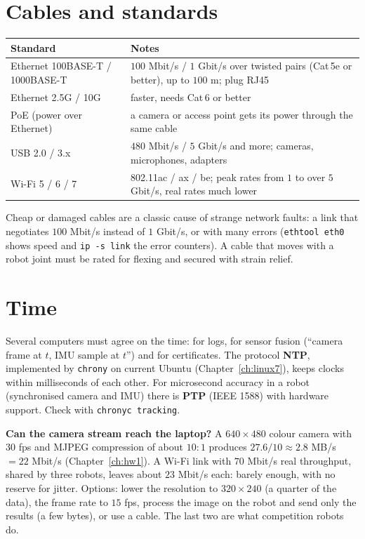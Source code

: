 \section*{Cables and standards}
\begin{center}
\renewcommand{\arraystretch}{1.2}
\begin{tabular}{p{3.8cm}p{9.2cm}}
\textbf{Standard} & \textbf{Notes}\\ \hline
Ethernet 100BASE-T / 1000BASE-T & $100$ Mbit/s / $1$ Gbit/s over twisted pairs (Cat\,5e or better), up to $100$ m; plug RJ45\\
Ethernet 2.5G / 10G & faster, needs Cat\,6 or better\\
PoE (power over Ethernet) & a camera or access point gets its power through the same cable\\
USB 2.0 / 3.x & $480$ Mbit/s / $5$ Gbit/s and more; cameras, microphones, adapters\\
Wi-Fi 5 / 6 / 7 & 802.11ac / ax / be; peak rates from $1$ to over $5$ Gbit/s, real rates much lower\\
\end{tabular}
\end{center}
Cheap or damaged cables are a classic cause of strange network faults: a link that negotiates $100$ Mbit/s instead of $1$ Gbit/s, or with many errors (\texttt{ethtool eth0} shows speed and \texttt{ip -s link} the error counters). A cable that moves with a robot joint must be rated for flexing and secured with strain relief.

\section*{Time}
Several computers must agree on the time: for logs, for sensor fusion (``camera frame at $t$, IMU sample at $t$'') and for certificates. The protocol \textbf{NTP}, implemented by \texttt{chrony} on current Ubuntu (Chapter~\ref{ch:linux7}), keeps clocks within milliseconds of each other. For microsecond accuracy in a robot (synchronised camera and IMU) there is \textbf{PTP} (IEEE 1588) with hardware support. Check with \verb!chronyc tracking!.

\begin{example}
\textbf{Can the camera stream reach the laptop?} A $640\times480$ colour camera with $30$ fps and MJPEG compression of about $10\!:\!1$ produces $27.6/10\approx2.8$ MB/s $=22$ Mbit/s (Chapter~\ref{ch:hw1}). A Wi-Fi link with $70$ Mbit/s real throughput, shared by three robots, leaves about $23$ Mbit/s each: barely enough, with no reserve for jitter. Options: lower the resolution to $320\times240$ (a quarter of the data), the frame rate to $15$ fps, process the image on the robot and send only the results (a few bytes), or use a cable. The last two are what competition robots do.
\end{example}

